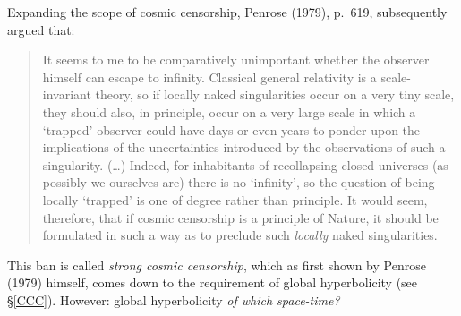 \documentclass[11pt,a4paper]{article}
\begin{document}
Expanding the scope of cosmic censorship, Penrose (1979), p.\ 619,  subsequently argued that:
  \begin{quote}
\begin{small}
It seems to me to be comparatively unimportant whether the observer himself can escape to infinity. Classical general relativity is a scale-invariant theory, so if locally naked singularities occur on a very tiny scale, they should also, in principle, occur on a very large scale in which a `trapped' observer could have days or even years to ponder upon the implications of the uncertainties introduced by the observations of such a singularity. (\ldots) Indeed, for inhabitants of recollapsing closed universes (as possibly we ourselves are) there is no `infinity', so the question of being locally `trapped' is one of degree rather than principle.  
It would seem, therefore, that if cosmic censorship is a principle of Nature, it should be formulated in such a way as to preclude such \emph{locally} naked singularities.
\end{small}
\end{quote} 
This ban is called \emph{strong cosmic censorship}, which as first shown by Penrose (1979) himself, comes down to the requirement of global hyperbolicity (see \S\ref{CCC}). However: global hyperbolicity \emph{of which space-time?}
\end{document}

